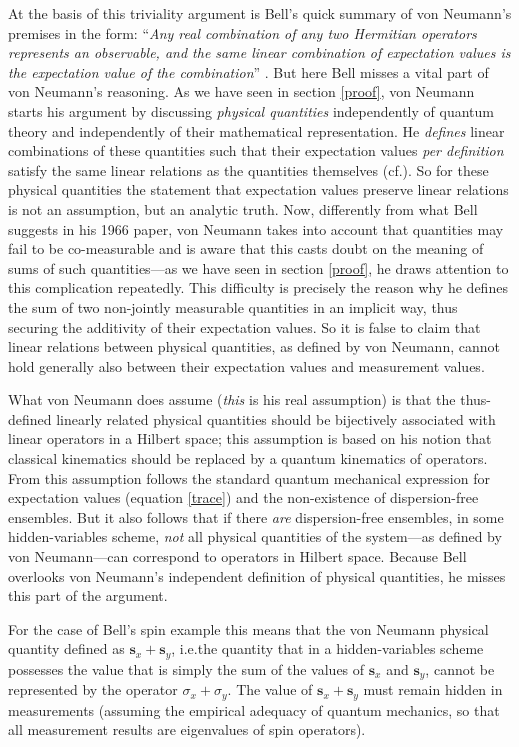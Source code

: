 \documentclass[11pt]{article}
\begin{document}
At the basis of this triviality argument is Bell's quick summary of von Neumann's premises in the form: ``\emph{Any real combination of any two Hermitian operators represents an observable, and the same linear combination of expectation values is the expectation value of the combination}'' \cite[pp.\@ 448--449]{bell66}. But here Bell misses a vital part of von Neumann's reasoning. As we have seen in section \ref{proof}, von Neumann starts his argument by discussing \emph{physical quantities} independently of quantum theory and independently of their mathematical representation. He \emph{defines} linear combinations of these quantities such that their expectation values \emph{per definition} satisfy the same linear relations as the quantities themselves (cf.\@ \cite{bub}). So for these physical quantities the statement that expectation values preserve linear relations is not an assumption, but an analytic truth. Now, differently from what Bell suggests in his 1966 paper, von Neumann takes into account that quantities may fail to be co-measurable and is aware that this casts doubt on the meaning of sums of such quantities---as we have seen in section \ref{proof}, he draws attention to this complication repeatedly. This difficulty is precisely the reason why he defines the sum of two non-jointly measurable quantities in an implicit way, thus securing the additivity of their expectation values. So it is false to claim that linear relations between physical quantities, as defined by von Neumann, cannot hold generally also between their expectation values and measurement values.

What von Neumann does assume (\emph{this} is his real assumption) is that the thus-defined linearly related physical quantities should be bijectively associated with linear operators in a Hilbert space; this assumption is based on his notion that classical kinematics should be replaced by a quantum kinematics of operators. From this assumption follows the standard quantum mechanical expression for expectation values (equation \ref{trace}) and the non-existence of dispersion-free ensembles. But it also follows that if there \emph{are} dispersion-free ensembles, in some hidden-variables scheme, \emph{not} all physical quantities of the system---as defined by von Neumann---can correspond to operators in Hilbert space. Because Bell overlooks von Neumann's independent definition of physical quantities, he misses this part of the argument.

For the case of Bell's spin example this means that the von Neumann physical quantity defined as $\textbf{s}_x + \textbf{s}_y$, i.e.\@ the quantity that in a hidden-variables scheme possesses the value that is simply the sum of the values of $\textbf{s}_x$ and $\textbf{s}_y$, cannot be represented by the operator $\sigma_x + \sigma_y$. The value of $\textbf{s}_x + \textbf{s}_y$ must remain hidden in measurements (assuming the empirical adequacy of quantum mechanics, so that all measurement results are eigenvalues of spin operators).
\end{document}
